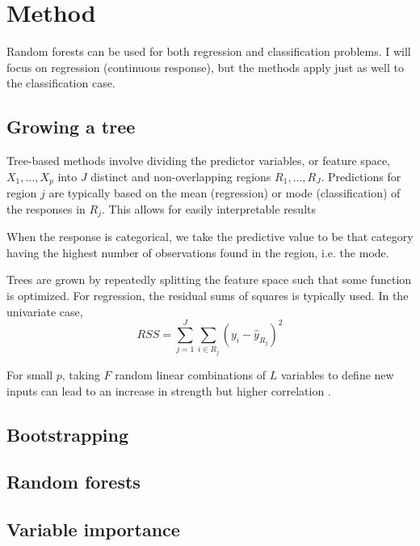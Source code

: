 \section{Method}

Random forests can be used for both regression and classification problems. I will focus on regression (continuous response), but the methods apply just as well to the classification case.

\subsection{Growing a tree}

Tree-based methods involve dividing the predictor variables, or feature space, $X_1,\ldots,X_p$ into $J$ distinct and non-overlapping regions $R_1,\ldots,R_J$. Predictions for region $j$ are typically based on the mean (regression) or mode (classification) of the responses in $R_j$. This allows for easily interpretable results 

When the response is categorical, we take the predictive value to be that category having the highest number of observations found in the region, i.e. the mode.

Trees are grown by repeatedly splitting the feature space such that some function is optimized. For regression, the residual sums of squares is typically used. In the univariate case,
\[ RSS=\sum_{j=1}^J\sum_{i\in R_j}(y_i - \hat{y}_{R_j})^2 \]



For small $p$, taking $F$ random linear combinations of $L$ variables to define new inputs can lead to an increase in strength but higher correlation \citep{breiman:2001}. \cite{segal:2011} \cite{death:2002}

\subsection{Bootstrapping}


\subsection{Random forests}


\subsection{Variable importance}
